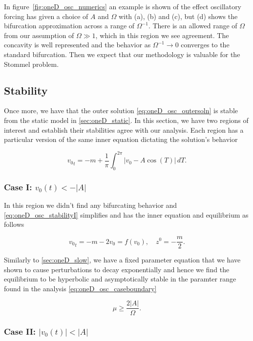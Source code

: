 In figure~\ref{fig:oneD_osc_numerics} an example is shown of the effect oscillatory forcing has given a choice of $A$ and $\Omega$ with (a), (b) and (c), but (d) shows the bifurcation approximation across a range of $\Omega^{-1}$. There is an allowed range of $\Omega$ from our assumption of $\Omega \gg 1$, which in this region we see agreement. The concavity is well represented and the behavior as $\Omega^{-1}\to 0$ converges to the standard bifurcation. Then we expect that our methodology is valuable for the Stommel problem.

\subsection{Stability}

Once more, we have that the outer solution \eqref{eq:oneD_osc_outersoln} is stable from the static model in \autoref{sec:oneD_static}. In this section, we have two regions of interest and establish their stabilities agree with our analysis. Each region has a particular version of the same inner equation dictating the solution's behavior

\begin{equation}\label{eq:oneD_osc_stabilityI}
{v_0}_t=-m+\frac{1}{\pi}\int_0^{2\pi}|v_0-A\cos(T)|\,dT.
\end{equation}

\subsubsection{Case I: $v_0(t)< -|A|$}

In this region we didn't find any bifurcating behavior and \eqref{eq:oneD_osc_stabilityI} simplifies and has the inner equation and equilibrium as follows

\begin{equation*}
{v_0}_t=-m-2v_0=f(v_0), \quad z^0=-\frac{m}{2}.
\end{equation*}

Similarly to \autoref{sec:oneD_slow}, we have a fixed parameter equation that we have shown to cause perturbations to decay exponentially and hence we find the equilibrium to be hyperbolic and asymptotically stable in the paramter range found in the analysis \eqref{eq:oneD_osc_caseboundary}

\begin{equation*}
\mu \ge \frac{2|A|}{\Omega}.
\end{equation*}

\subsubsection{Case II: $|v_0(t)|<|A|$}

